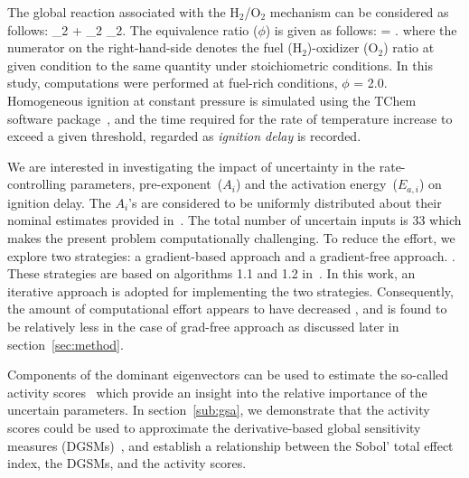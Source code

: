 The global reaction associated with the H$_2$/O$_2$ mechanism can
be considered as follows:
_2 + _2 _2.
\label{eq:global}
\ee 
The equivalence ratio ($\phi$) is given as follows:
%
\be
\phi = .
\label{eq:phi}
\ee
%
where the numerator on the right-hand-side denotes the fuel (H$_2$)-oxidizer
(O$_2$) ratio at given condition to the same quantity under stoichiometric
conditions. In this study, computations were performed at fuel-rich conditions,
$\phi$ = 2.0. Homogeneous ignition at constant pressure is simulated using the
TChem software package~\cite{Safta:2011}, and the time required for the rate of
temperature increase to exceed a given threshold, regarded as \emph{ignition delay}
is recorded. 

We are interested in investigating the impact of uncertainty in the
rate-controlling parameters, pre-exponent~($A_i$) and the activation
energy~($E_{a,i}$) on ignition delay. The $A_i$'s are considered to be
uniformly distributed about their nominal estimates provided
in~\cite{Yetter:1991}.  The total number of uncertain inputs is 33 which makes
the present problem computationally challenging. 
To reduce the effort, we explore two
strategies: 
a gradient-based approach and  
a gradient-free approach.
. 
%
These strategies are based on algorithms 1.1 and 1.2 
in~\cite{Constantine:2015}. In this work, an
iterative approach is adopted for implementing the two strategies.
Consequently, the amount of computational effort appears to have decreased
, and
is found to be relatively less in the case of grad-free approach as discussed
later in section~\ref{sec:method}.

Components of the dominant eigenvectors can be used to estimate the so-called
activity scores~\cite{Diaz:2016,Constantine:2017} which provide an insight into
the relative importance of the uncertain parameters. In section~\ref{sub:gsa},
we demonstrate that the activity scores could be used to approximate the
derivative-based global sensitivity measures (DGSMs)~\cite{Sobol:2009}, and
establish a relationship between the Sobol' total effect index, the DGSMs, and
the activity scores. 


